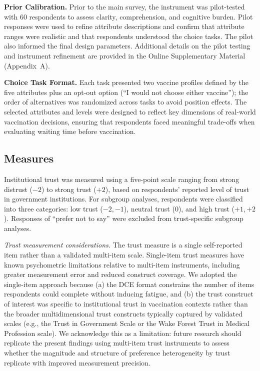 \documentclass[12pt]{article}
\begin{document}
\textbf{Prior Calibration.} Prior to the main survey, the instrument was pilot-tested with 60 respondents to assess clarity, comprehension, and cognitive burden. Pilot responses were used to refine attribute descriptions and confirm that attribute ranges were realistic and that respondents understood the choice tasks. The pilot also informed the final design parameters. Additional details on the pilot testing and instrument refinement are provided in the Online Supplementary Material (Appendix~A).

\textbf{Choice Task Format.} Each task presented two vaccine profiles defined by the five attributes plus an opt-out option (``I would not choose either vaccine''); the order of alternatives was randomized across tasks to avoid position effects. The selected attributes and levels were designed to reflect key dimensions of real-world vaccination decisions, ensuring that respondents faced meaningful trade-offs when evaluating waiting time before vaccination.
\subsection{Measures}

Institutional trust was measured using a five-point scale ranging from strong distrust (\(-2\)) to strong trust (\(+2\)), based on respondents' reported level of trust in government institutions. For subgroup analyses, respondents were classified into three categories: low trust (\(-2,-1\)), neutral trust (\(0\)), and high trust (\(+1,+2\)). Responses of ``prefer not to say'' were excluded from trust-specific subgroup analyses.

\textit{Trust measurement considerations.} The trust measure is a single self-reported item rather than a validated multi-item scale. Single-item trust measures have known psychometric limitations relative to multi-item instruments, including greater measurement error and reduced construct coverage. We adopted the single-item approach because (a) the DCE format constrains the number of items respondents could complete without inducing fatigue, and (b) the trust construct of interest was specific to institutional trust in vaccination contexts rather than the broader multidimensional trust constructs typically captured by validated scales (e.g., the Trust in Government Scale or the Wake Forest Trust in Medical Profession scale). We acknowledge this as a limitation: future research should replicate the present findings using multi-item trust instruments to assess whether the magnitude and structure of preference heterogeneity by trust replicate with improved measurement precision.
\end{document}
